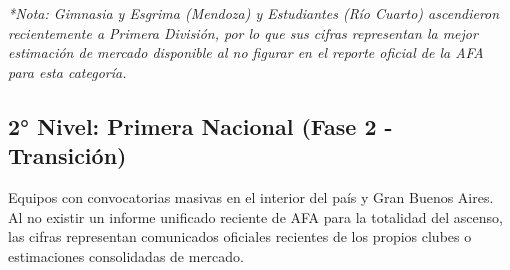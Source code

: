 \textit{*Nota: Gimnasia y Esgrima (Mendoza) y Estudiantes (Río Cuarto) ascendieron recientemente a Primera División, por lo que sus cifras representan la mejor estimación de mercado disponible al no figurar en el reporte oficial de la AFA para esta categoría.}

\newpage

\subsection{2° Nivel: Primera Nacional (Fase 2 - Transición)}

Equipos con convocatorias masivas en el interior del país y Gran Buenos Aires. Al no existir un informe unificado reciente de AFA para la totalidad del ascenso, las cifras representan comunicados oficiales recientes de los propios clubes o estimaciones consolidadas de mercado.


